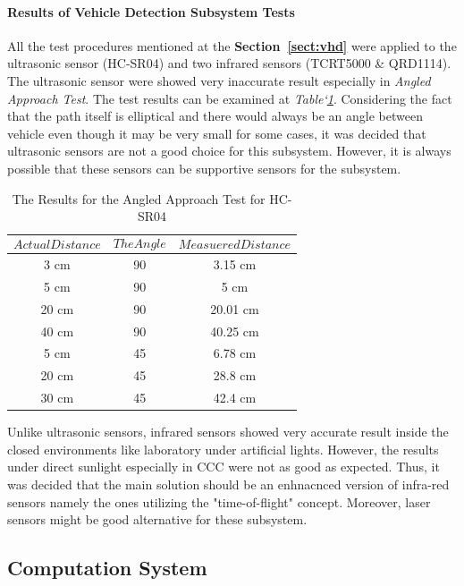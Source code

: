 \documentclass[a4paper,12pt]{article}
\begin{document}
	\paragraph{Results of Vehicle Detection Subsystem Tests}
	
		All the test procedures mentioned at the \textbf{Section~\ref{sect:vhd}} were applied to the ultrasonic sensor (HC-SR04) and two infrared sensors (TCRT5000 \& QRD1114). The ultrasonic sensor were showed very inaccurate result especially in \textit{Angled Approach Test}. The test results can be examined at \textit{Table`\ref{tab:aat}}. Considering the fact that the path itself is elliptical and there would always be an angle between vehicle even though it may be very small for some cases, it was decided that ultrasonic sensors are not a good choice for this subsystem. However, it is always possible that these sensors can be supportive sensors for the subsystem.
		
		\begin{table}[H]
		  \centering
		  	\caption{The Results for the Angled Approach Test for HC-SR04}
		    \begin{tabular}{c|c|c}
    		   $$Actual Distance$$ & $$The Angle$$ & $$Measuered Distance$$ \\ \hline
			   3  cm & 90 & 3.15 cm  \\ \hline
    		   5  cm & 90 & 5 cm  \\ \hline
    		   20 cm & 90 & 20.01 cm  \\ \hline
    		   40 cm & 90 & 40.25 cm \\ \hline
       		   5  cm & 45 & 6.78 cm \\ \hline
    		   20 cm & 45 & 28.8 cm  \\ \hline
       		   30 cm & 45 & 42.4 cm  
  			\end{tabular}
  			\label{tab:aat}
		\end{table}
		
		 Unlike ultrasonic sensors, infrared sensors showed very accurate result inside the closed environments like laboratory under artificial lights. However, the results under direct sunlight especially in CCC were not as good as expected.  Thus, it was decided that the main solution should be an enhnacnced version of infra-red sensors namely the ones utilizing the "time-of-flight" concept. Moreover, laser sensors might be good alternative for these subsystem.
		
	\subsection{Computation System}
	
\end{document}

